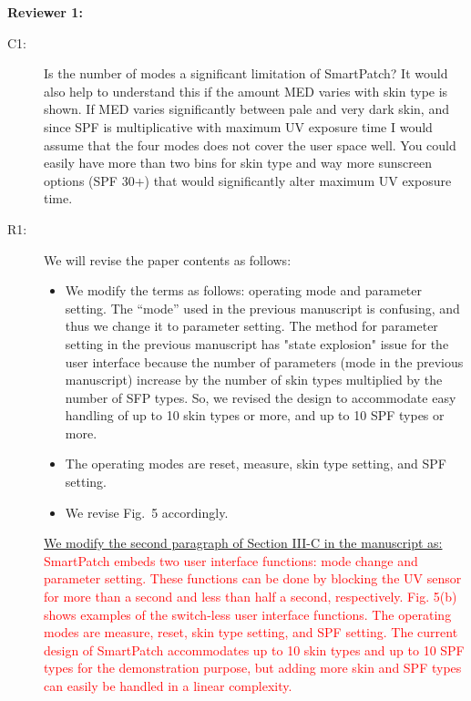 \documentclass[onecolumn]{IEEEconf}
\begin{document}
\textbf{Reviewer 1:}
\begin{description}
\item [C1: ] Is the number of modes a significant limitation of SmartPatch? It would also help to understand this if the amount MED varies with skin type is shown. If MED varies significantly between pale and very dark skin, and since SPF is multiplicative with maximum UV exposure time I would assume that the four modes does not cover the user space well. You could easily have more than two bins for skin type and way more sunscreen options (SPF 30+) that would significantly alter maximum UV exposure time.  
\item [R1: ] We will revise the paper contents as follows:
\begin{itemize}
\item We modify the terms as follows: operating mode and parameter setting.  The ``mode'' used in the previous manuscript is confusing, and thus we change it to parameter setting. The method for parameter setting in the previous manuscript has "state explosion" issue for the user interface because the number of parameters (mode in the previous manuscript) increase by the number of skin types multiplied by the number of SFP types. So, we revised the design to accommodate easy handling of up to 10 skin types or more, and up to 10 SPF types or more.
\item The operating modes are reset, measure, skin type setting, and SPF setting.
\item We revise Fig.~5 accordingly.
\end{itemize}

\underline{We modify the second paragraph of Section III-C in the manuscript as:}\\
\textcolor{red}{SmartPatch embeds two user interface functions: mode change and parameter setting. These functions can be done by blocking the UV sensor for more than a second and less than half a second, respectively. Fig. 5(b) shows examples of the switch-less user interface functions. The operating modes are measure, reset, skin type setting, and SPF setting. The current design of SmartPatch accommodates up to 10 skin types and up to 10 SPF types for the demonstration purpose, but adding more skin and SPF types can easily be handled in a linear complexity.}


\end{description}
\end{document}
